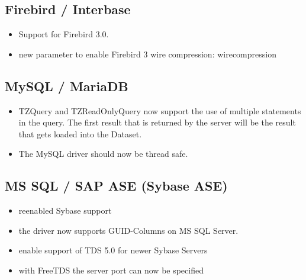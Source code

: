 \documentclass[a4paper,12pt,oneside]{article}
\begin{document}
\subsection{Firebird / Interbase}
\begin{itemize}
\item Support for Firebird 3.0.
\item new parameter to enable Firebird 3 wire compression: wirecompression
\end{itemize}

\subsection{MySQL / MariaDB}
\begin{itemize}
\item
  TZQuery and TZReadOnlyQuery now support the use of multiple statements in the query.
	The first result that is returned by the server will be the result that gets loaded into the Dataset.
\item
  The MySQL driver should now be thread safe.
\end{itemize}

\subsection{MS SQL / SAP ASE (Sybase ASE)}
\begin{itemize}
\item reenabled Sybase support
\item the driver now supports GUID-Columns on MS SQL Server.
\item enable support of TDS 5.0 for newer Sybase Servers
\item with FreeTDS the server port can now be specified
\end{itemize}
\end{document}
